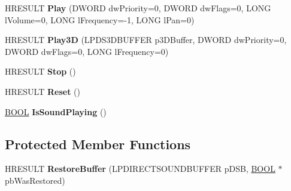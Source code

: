 \begin{DoxyCompactItemize}
\item 
\hypertarget{class_c_sound_a9c0e5e3cf50601f679d17a38036cef14}{H\+R\+E\+S\+U\+L\+T {\bfseries Play} (D\+W\+O\+R\+D dw\+Priority=0, D\+W\+O\+R\+D dw\+Flags=0, L\+O\+N\+G l\+Volume=0, L\+O\+N\+G l\+Frequency=-\/1, L\+O\+N\+G l\+Pan=0)}\label{class_c_sound_a9c0e5e3cf50601f679d17a38036cef14}

\item 
\hypertarget{class_c_sound_aac53e4ca27f447ca2477d3e9ab50938a}{H\+R\+E\+S\+U\+L\+T {\bfseries Play3\+D} (L\+P\+D\+S3\+D\+B\+U\+F\+F\+E\+R p3\+D\+Buffer, D\+W\+O\+R\+D dw\+Priority=0, D\+W\+O\+R\+D dw\+Flags=0, L\+O\+N\+G l\+Frequency=0)}\label{class_c_sound_aac53e4ca27f447ca2477d3e9ab50938a}

\item 
\hypertarget{class_c_sound_af394d295721d4d8bf05dd20531b4cf91}{H\+R\+E\+S\+U\+L\+T {\bfseries Stop} ()}\label{class_c_sound_af394d295721d4d8bf05dd20531b4cf91}

\item 
\hypertarget{class_c_sound_aaf2b066d599976ba180082b4fa3880e3}{H\+R\+E\+S\+U\+L\+T {\bfseries Reset} ()}\label{class_c_sound_aaf2b066d599976ba180082b4fa3880e3}

\item 
\hypertarget{class_c_sound_ae4677b9565a96892a3a494698392670b}{\hyperlink{_ice_types_8h_a050c65e107f0c828f856a231f4b4e788}{B\+O\+O\+L} {\bfseries Is\+Sound\+Playing} ()}\label{class_c_sound_ae4677b9565a96892a3a494698392670b}

\end{DoxyCompactItemize}
\subsection*{Protected Member Functions}
\begin{DoxyCompactItemize}
\item 
\hypertarget{class_c_sound_ab74aca2529b37470e7dcb7bc4eadbdbc}{H\+R\+E\+S\+U\+L\+T {\bfseries Restore\+Buffer} (L\+P\+D\+I\+R\+E\+C\+T\+S\+O\+U\+N\+D\+B\+U\+F\+F\+E\+R p\+D\+S\+B, \hyperlink{_ice_types_8h_a050c65e107f0c828f856a231f4b4e788}{B\+O\+O\+L} $\ast$pb\+Was\+Restored)}\label{class_c_sound_ab74aca2529b37470e7dcb7bc4eadbdbc}

\end{DoxyCompactItemize}
